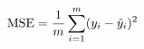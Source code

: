 \documentclass[preview]{standalone}
\begin{document}
\begin{align*}
\special{dvisvgm:raw <g id='unique000'>}\text{MSE} = \frac{1}{m} \sum_{i=1}^{m} (y_i - \hat{y}_i)^2\special{dvisvgm:raw </g>}
\end{align*}
\end{document}
